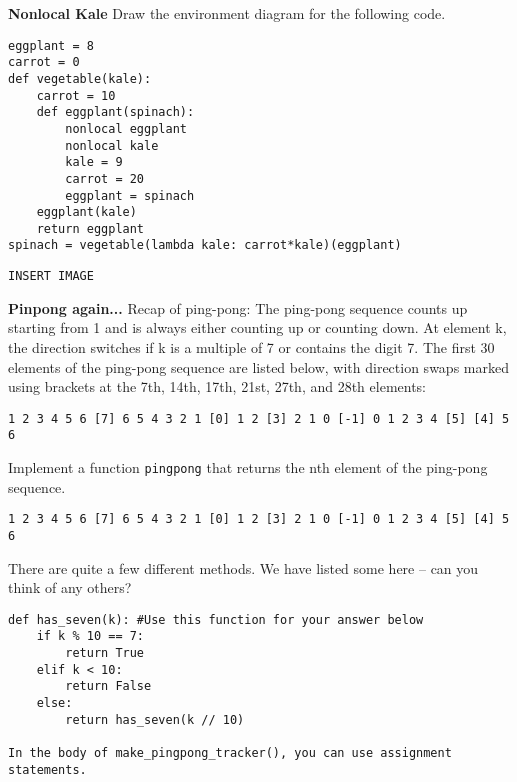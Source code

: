 \documentclass{exam}
\begin{document}
\begin{questions}

\begin{blocksection}
\question \textbf{Nonlocal Kale} Draw the environment diagram for the following code.

\begin{lstlisting}
eggplant = 8
carrot = 0
def vegetable(kale):
    carrot = 10
    def eggplant(spinach):
        nonlocal eggplant
        nonlocal kale
        kale = 9
        carrot = 20
        eggplant = spinach
    eggplant(kale)
    return eggplant
spinach = vegetable(lambda kale: carrot*kale)(eggplant)
\end{lstlisting}

\begin{solution}[1in]
\begin{lstlisting}
INSERT IMAGE
\end{lstlisting}
\end{solution}

\end{blocksection}

\begin{blocksection}
\question \textbf{Pinpong again...}  Recap of ping-pong: The ping-pong sequence counts up starting from 1 and is always either counting up or counting down. At element k, the direction switches if k is a multiple of 7 or contains the digit 7. The first 30 elements of the ping-pong sequence are listed below, with direction swaps marked using brackets at the 7th, 14th, 17th, 21st, 27th, and 28th elements:
\begin{lstlisting}
1 2 3 4 5 6 [7] 6 5 4 3 2 1 [0] 1 2 [3] 2 1 0 [-1] 0 1 2 3 4 [5] [4] 5 6
\end{lstlisting}
Implement a function \texttt{pingpong} that returns the nth element of the ping-pong sequence.
\newline
\begin{lstlisting}
1 2 3 4 5 6 [7] 6 5 4 3 2 1 [0] 1 2 [3] 2 1 0 [-1] 0 1 2 3 4 [5] [4] 5 6
\end{lstlisting}
\begin{solution}[1in]
There are quite a few different methods. We have listed some here -- can you
think of any others?
\begin{lstlisting}
def has_seven(k): #Use this function for your answer below
    if k % 10 == 7:
        return True
    elif k < 10:
        return False
    else:
        return has_seven(k // 10)

In the body of make_pingpong_tracker(), you can use assignment statements.


\end{lstlisting}
\end{solution}
\end{blocksection}
\end{questions}
\end{document}
